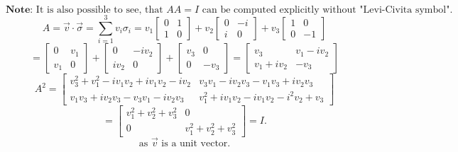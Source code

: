 \documentclass{article}
\begin{document}
\begin{framed}
    $$
    \textbf{Note:} \text{ It is also possible to see, that } AA = I \text{ can be computed explicitly without "Levi-Civita symbol"}.
    $$
    $$
    A = \vec{v} \cdot \vec{\sigma} = \sum_{i=1}^{3}v_i\sigma_{i} = v_1\begin{bmatrix}0 & 1 \\ 1 & 0\end{bmatrix} + v_2\begin{bmatrix}0 & -i \\ i & 0\end{bmatrix} + v_3\begin{bmatrix}1 & 0 \\ 0 & -1\end{bmatrix}
    $$
    $$
    = \begin{bmatrix}0 & v_1 \\ v_1 & 0\end{bmatrix} + \begin{bmatrix}0 & -iv_2 \\ iv_2 & 0\end{bmatrix} + \begin{bmatrix}v_3 & 0 \\ 0 & -v_3\end{bmatrix} = \begin{bmatrix}v_3 & v_1-iv_2 \\ v_1 + iv_2 & -v_3\end{bmatrix}
    $$
    $$
    A^2 = \begin{bmatrix} v_3^2 +v_1^2 -iv_1v_2 + iv_1v_2 -iv_2  & v_3v_1 -iv_2v_3 -v_1v_3 + iv_2v_3\\ v_1v_3 + iv_2v_3 -v_3v_1 -iv_2v_3 & v_1^2 +iv_1v_2 - iv_1v_2 -i^2v_2 + v_3 \end{bmatrix}
    $$
    $$
    = \begin{bmatrix}v_1^2+v_2^2+v_3^2 & 0 \\ 0 & v_1^2+v_2^2+v_3^2\end{bmatrix} = I.
    $$
    $$
    \text{as } \vec{v} \text{ is a unit vector}.
    $$
    
    
\end{framed}

\bigskip
\end{document}
